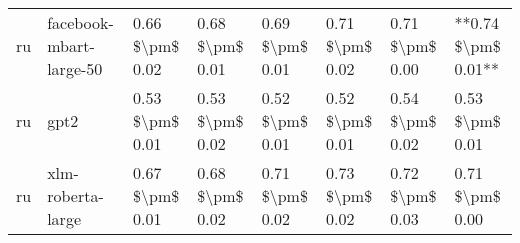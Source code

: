 \begin{tabular}{llllllll}
      ru &            facebook-mbart-large-50 & 0.66 \$\textbackslash pm\$ 0.02 &           0.68 \$\textbackslash pm\$ 0.01 &       0.69 \$\textbackslash pm\$ 0.01 &        0.71 \$\textbackslash pm\$ 0.02 &                         0.71 \$\textbackslash pm\$ 0.00 & **0.74 \$\textbackslash pm\$ 0.01** \\
      ru &                               gpt2 & 0.53 \$\textbackslash pm\$ 0.01 &           0.53 \$\textbackslash pm\$ 0.02 &       0.52 \$\textbackslash pm\$ 0.01 &        0.52 \$\textbackslash pm\$ 0.01 &                         0.54 \$\textbackslash pm\$ 0.02 &     0.53 \$\textbackslash pm\$ 0.01 \\
      ru &                  xlm-roberta-large & 0.67 \$\textbackslash pm\$ 0.01 &           0.68 \$\textbackslash pm\$ 0.02 &       0.71 \$\textbackslash pm\$ 0.02 &        0.73 \$\textbackslash pm\$ 0.02 &                         0.72 \$\textbackslash pm\$ 0.03 &     0.71 \$\textbackslash pm\$ 0.00 \\
\bottomrule
\end{tabular}
